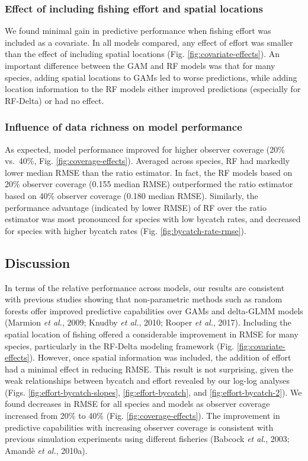 \documentclass[]{article}
\begin{document}
\subsubsection{Effect of including fishing effort and spatial
locations}\label{effect-of-including-fishing-effort-and-spatial-locations}

We found minimal gain in predictive performance when fishing effort was
included as a covariate. In all models compared, any effect of effort
was smaller than the effect of including spatial locations (Fig.
\ref{fig:covariate-effects}). An important difference between the GAM
and RF models was that for many species, adding spatial locations to
GAMs led to worse predictions, while adding location information to the
RF models either improved predictions (especially for RF-Delta) or had
no effect.

\subsubsection{Influence of data richness on model
performance}\label{influence-of-data-richness-on-model-performance}

As expected, model performance improved for higher observer coverage
(20\% vs.~40\%, Fig. \ref{fig:coverage-effects}). Averaged across
species, RF had markedly lower median RMSE than the ratio estimator. In
fact, the RF models based on 20\% observer coverage (0.155 median RMSE)
outperformed the ratio estimator based on 40\% observer coverage (0.180
median RMSE). Similarly, the performance advantage (indicated by lower
RMSE) of RF over the ratio estimator was most pronounced for species
with low bycatch rates, and decreased for species with higher bycatch
rates (Fig. \ref{fig:bycatch-rate-rmse}).

\subsection{Discussion}\label{discussion}

In terms of the relative performance across models, our results are
consistent with previous studies showing that non-parametric methods
such as random forests offer improved predictive capabilities over GAMs
and delta-GLMM models (Marmion \emph{et al.}, 2009; Knudby \emph{et
al.}, 2010; Rooper \emph{et al.}, 2017). Including the spatial location
of fishing offered a considerable improvement in RMSE for many species,
particularly in the RF-Delta modeling framework (Fig.
\ref{fig:covariate-effects}). However, once spatial information was
included, the addition of effort had a minimal effect in reducing RMSE.
This result is not surprising, given the weak relationships between
bycatch and effort revealed by our log-log analyses (Figs.
\ref{fig:effort-bycatch-slopes}, \ref{fig:effort-bycatch}, and
\ref{fig:effort-bycatch-2}). We found decreases in RMSE for all species
and models as observer coverage increased from 20\% to 40\% (Fig.
\ref{fig:coverage-effects}). The improvement in predictive capabilities
with increasing observer coverage is consistent with previous simulation
experiments using different fisheries (Babcock \emph{et al.}, 2003;
Amandè \emph{et al.}, 2010a).
\end{document}
